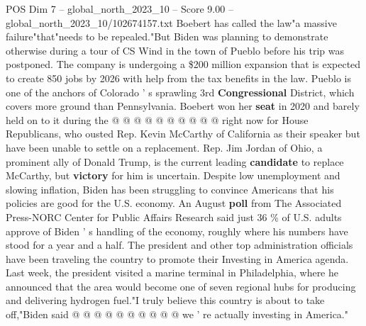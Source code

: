 \begin{textsample}{POS Dim 7 – global\_north\_2023\_10 – Score 9.00 – global\_north\_2023\_10/102674157.txt}
Boebert has called the law"a massive failure"that"needs to be repealed."But Biden was planning to demonstrate otherwise during a tour of CS Wind in the town of Pueblo before his trip was postponed.
The company is undergoing a \$200 million expansion that is expected to create 850 jobs by 2026 with help from the tax benefits in the law.
Pueblo is one of the anchors of Colorado ' s sprawling 3rd \textbf{Congressional} District, which covers more ground than Pennsylvania.
Boebert won her \textbf{seat} in 2020 and barely held on to it during the @ @ @ @ @ @ @ @ @ @ right now for House Republicans, who ousted Rep.
Kevin McCarthy of California as their speaker but have been unable to settle on a replacement.
Rep.
Jim Jordan of Ohio, a prominent ally of Donald Trump, is the current leading \textbf{candidate} to replace McCarthy, but \textbf{victory} for him is uncertain.
Despite low unemployment and slowing inflation, Biden has been struggling to convince Americans that his policies are good for the U.S. economy.
An August \textbf{poll} from The Associated Press-NORC Center for Public Affairs Research said just 36 \% of U.S. adults approve of Biden ' s handling of the economy, roughly where his numbers have stood for a year and a half.
The president and other top administration officials have been traveling the country to promote their Investing in America agenda.
Last week, the president visited a marine terminal in Philadelphia, where he announced that the area would become one of seven regional hubs for producing and delivering hydrogen fuel."I truly believe this country is about to take off,"Biden said @ @ @ @ @ @ @ @ @ @ we ' re actually investing in America."

\end{textsample}
